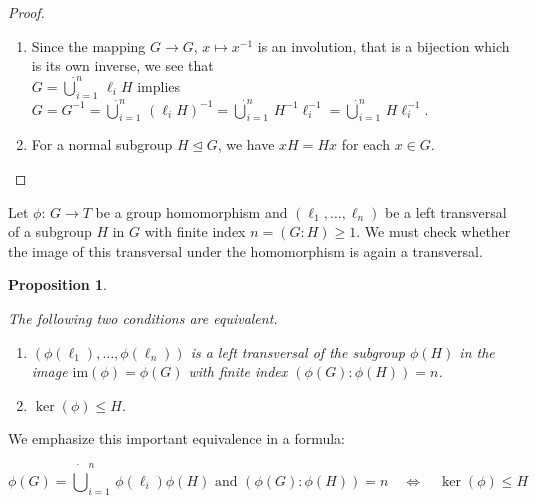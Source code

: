 \documentclass{amsart}
\newtheorem{proposition}{Proposition}[section]
\theoremstyle{definition}
\numberwithin{equation}{section}
\begin{document}
\begin{proof}

\begin{enumerate}

\item
Since the mapping \(G\to G\), \(x\mapsto x^{-1}\) is an involution, that is a bijection which is its own inverse, 
we see that\\
\(G=\dot{\bigcup}_{i=1}^n\,\ell_iH\) \quad implies \quad
\(G=G^{-1}=\dot{\bigcup}_{i=1}^n\,(\ell_iH)^{-1}
=\dot{\bigcup}_{i=1}^n\,H^{-1}\ell_i^{-1}=\dot{\bigcup}_{i=1}^n\,H\ell_i^{-1}\).

\item
For a normal subgroup \(H\unlhd G\), we have \(xH=Hx\) for each \(x\in G\).

\end{enumerate}

\end{proof}


\noindent
Let \(\phi:\,G\to T\) be a group homomorphism and
\((\ell_1,\ldots,\ell_n)\) be a left transversal of a subgroup \(H\) in \(G\)
with finite index \(n=(G:H)\ge 1\).
We must check whether the image of this transversal under the homomorphism is again a transversal.

\begin{proposition}
\label{prp:TransvUnderHom}

The following two conditions are equivalent.

\begin{enumerate}

\item
\((\phi(\ell_1),\ldots,\phi(\ell_n))\) is a left transversal
of the subgroup \(\phi(H)\) in the image \(\mathrm{im}(\phi)=\phi(G)\)
with finite index \((\phi(G):\phi(H))=n\).

\item
\(\ker(\phi)\le H\).

\end{enumerate}

\end{proposition}


\noindent
We emphasize this important equivalence in a formula:

\begin{equation}
\label{eqn:TransvUnderHom}
\phi(G)=\dot{\bigcup}_{i=1}^n\,\phi(\ell_i)\phi(H)\text{ and } (\phi(G):\phi(H))=n
\quad\Longleftrightarrow\quad
\ker(\phi)\le H
\end{equation}
\end{document}
